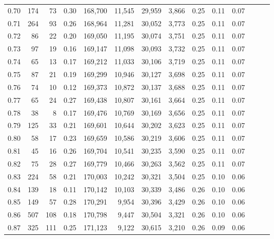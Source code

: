 \begin{tabular}{rrrrrrrrrrrrrr}
0.70 &     174 &     73 &  0.30 &  168,700 &   11,545 &  29,959 &   3,866 &  0.25 &  0.11 &      0.07 \\
0.71 &     264 &     93 &  0.26 &  168,964 &   11,281 &  30,052 &   3,773 &  0.25 &  0.11 &      0.07 \\
0.72 &      86 &     22 &  0.20 &  169,050 &   11,195 &  30,074 &   3,751 &  0.25 &  0.11 &      0.07 \\
0.73 &      97 &     19 &  0.16 &  169,147 &   11,098 &  30,093 &   3,732 &  0.25 &  0.11 &      0.07 \\
0.74 &      65 &     13 &  0.17 &  169,212 &   11,033 &  30,106 &   3,719 &  0.25 &  0.11 &      0.07 \\
0.75 &      87 &     21 &  0.19 &  169,299 &   10,946 &  30,127 &   3,698 &  0.25 &  0.11 &      0.07 \\
0.76 &      74 &     10 &  0.12 &  169,373 &   10,872 &  30,137 &   3,688 &  0.25 &  0.11 &      0.07 \\
0.77 &      65 &     24 &  0.27 &  169,438 &   10,807 &  30,161 &   3,664 &  0.25 &  0.11 &      0.07 \\
0.78 &      38 &      8 &  0.17 &  169,476 &   10,769 &  30,169 &   3,656 &  0.25 &  0.11 &      0.07 \\
0.79 &     125 &     33 &  0.21 &  169,601 &   10,644 &  30,202 &   3,623 &  0.25 &  0.11 &      0.07 \\
0.80 &      58 &     17 &  0.23 &  169,659 &   10,586 &  30,219 &   3,606 &  0.25 &  0.11 &      0.07 \\
0.81 &      45 &     16 &  0.26 &  169,704 &   10,541 &  30,235 &   3,590 &  0.25 &  0.11 &      0.07 \\
0.82 &      75 &     28 &  0.27 &  169,779 &   10,466 &  30,263 &   3,562 &  0.25 &  0.11 &      0.07 \\
0.83 &     224 &     58 &  0.21 &  170,003 &   10,242 &  30,321 &   3,504 &  0.25 &  0.10 &      0.06 \\
0.84 &     139 &     18 &  0.11 &  170,142 &   10,103 &  30,339 &   3,486 &  0.26 &  0.10 &      0.06 \\
0.85 &     149 &     57 &  0.28 &  170,291 &    9,954 &  30,396 &   3,429 &  0.26 &  0.10 &      0.06 \\
0.86 &     507 &    108 &  0.18 &  170,798 &    9,447 &  30,504 &   3,321 &  0.26 &  0.10 &      0.06 \\
0.87 &     325 &    111 &  0.25 &  171,123 &    9,122 &  30,615 &   3,210 &  0.26 &  0.09 &      0.06 \\

\end{tabular}
